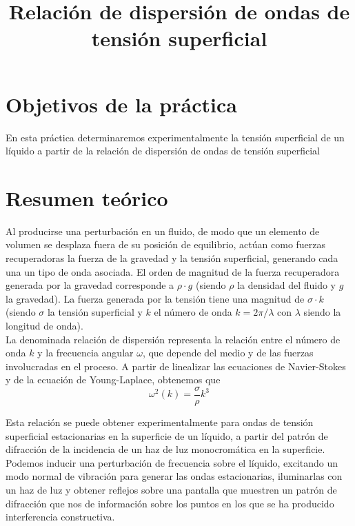 \documentclass[a4paper,12pt,spanish]{article}
\begin{document}
	
	
	\title{ Relación de dispersión de ondas de tensión superficial}
	
	\date{}
	
	\maketitle
	
	
	\section{Objetivos de la práctica}
	
	En esta práctica determinaremos experimentalmente la tensión superficial de un líquido a partir de la relación de dispersión de ondas de tensión superficial
	
	\section{Resumen teórico}
	
	
	Al producirse una perturbación en un fluido, de modo que un elemento de volumen se desplaza fuera de su posición de equilibrio, actúan como fuerzas recuperadoras la fuerza de la gravedad y la tensión superficial, generando cada una un tipo de onda asociada. El orden de magnitud de la fuerza recuperadora generada por la gravedad corresponde a $\rho\cdot g$ (siendo $\rho$ la densidad del fluido y $g$ la gravedad). La fuerza generada por la tensión tiene una magnitud de $\sigma \cdot k$ (siendo $\sigma$ la tensión superficial y $k$ el número de onda $k = 2\pi / \lambda$ con $\lambda$ siendo la longitud de onda).\\
	
	La denominada relación de dispersión representa la relación entre el número de onda $k$ y la frecuencia angular $\omega$, que depende del medio y de las fuerzas involucradas en el proceso. A partir de linealizar las ecuaciones de Navier-Stokes y de la ecuación de Young-Laplace, obtenemos que
	\[ \omega^2(k) = \frac{\sigma}{\rho} k^3
	\]
	
	Esta relación se puede obtener experimentalmente para ondas de tensión superficial estacionarias en la superficie de un líquido, a partir del patrón de difracción de la incidencia de un haz de luz monocromática en la superficie. Podemos inducir una perturbación de frecuencia sobre el líquido, excitando un modo normal de vibración para generar las ondas estacionarias, iluminarlas con un haz de luz y obtener reflejos sobre una pantalla que muestren un patrón de difracción que nos de información sobre los puntos en los que se ha producido interferencia constructiva.
	
\end{document}
